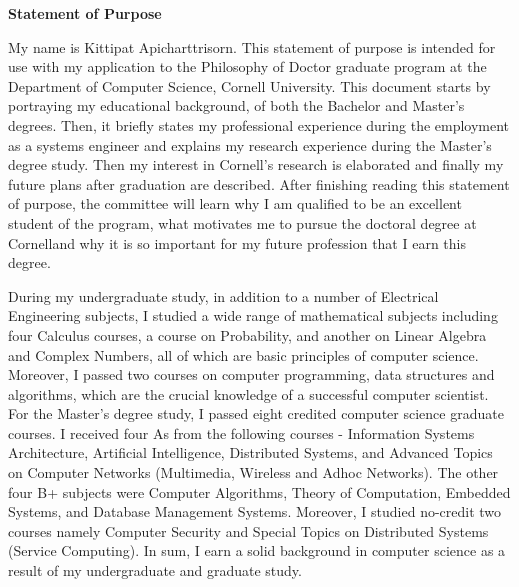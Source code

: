 \documentclass[10pt,a4paper,oneside]{report}
\newcommand{\university}{Cornell University}
\newcommand{\department}{Department of Computer Science}
\newcommand{\uniabbre}{Cornell}
\begin{document}
\begin{center}
\textbf{\large Statement of Purpose}
\end{center}

\vspace{0.4cm}
My name is Kittipat Apicharttrisorn. This statement of purpose is intended for use with my application to the Philosophy of Doctor graduate program at the \department, \university. This document starts by portraying my educational background, of both the Bachelor and Master's degrees. Then, it briefly states my professional experience during the employment as a systems engineer and explains my research experience during the Master's degree study. Then my interest in \uniabbre's research is elaborated and finally my future plans after graduation are described. After finishing reading this statement of purpose, the committee will learn why I am qualified to be an excellent student of the program, what motivates me to pursue the doctoral degree at \uniabbre \space and why it is so important for my future profession that I earn this degree.

\vspace{0.2cm}
During my undergraduate study, in addition to a number of Electrical Engineering subjects, I studied a wide range of mathematical subjects including four Calculus courses, a course on Probability, and another on Linear Algebra and Complex Numbers, all of which are basic principles of computer science. Moreover, I passed two courses on computer programming, data structures and algorithms, which are the crucial knowledge of a successful computer scientist. For the Master's degree study, I passed eight credited computer science graduate courses. I received four As from the following courses - Information Systems Architecture, Artificial Intelligence, Distributed Systems, and Advanced Topics on Computer Networks (Multimedia, Wireless and Adhoc Networks). The other four B+ subjects were Computer Algorithms, Theory of Computation, Embedded Systems, and Database Management Systems. Moreover, I studied no-credit two courses namely Computer Security and Special Topics on Distributed Systems (Service Computing). In sum, I earn a solid background in computer science as a result of my undergraduate and graduate study. 
\end{document}
